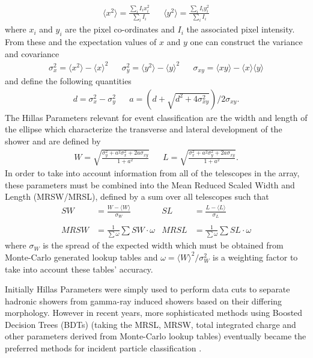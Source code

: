 \begin{align*}
\langle x^2 \rangle = \frac{\sum_i I_i x_i^2}{\sum_i I_i} && \langle y^2 \rangle = \frac{\sum_i I_i y_i^2}{\sum_i I_i}
\end{align*}
where $x_i$ and $y_i$ are the pixel co-ordinates and $I_i$ the associated pixel intensity. From these and the expectation values of $x$ and $y$ one can construct the variance and covariance
\begin{align*}
\sigma_x^2=\langle x^2 \rangle - \langle x \rangle^2&&\sigma_y^2=\langle y^2 \rangle - \langle y \rangle^2&&\sigma_{xy}=\langle xy \rangle - \langle x \rangle\langle y \rangle
\end{align*}
and define the following quantities
\begin{align*}
d=\sigma_x^2-\sigma_y^2&&a=(d+\sqrt{d^2+4\sigma_{xy}^2})/2\sigma_{xy}.
\end{align*}
The Hillas Parameters relevant for event classification are the width and length of the ellipse which characterize the transverse and lateral development of the shower and are defined by
\begin{align*}
W=\sqrt{\frac{\sigma_y^2+a^2\sigma_x^2+2a\sigma_{xy}}{1+a^2}}&&L=\sqrt{\frac{\sigma_x^2+a^2\sigma_y^2+2a\sigma_{xy}}{1+a^2}}.
\end{align*}
In order to take into account information from all of the telescopes in the array, these parameters must be combined into the Mean Reduced Scaled Width and Length (MRSW/MRSL), defined by a sum over all telescopes such that
\begin{align*}
SW&=\frac{W-\langle W \rangle}{\sigma_W}   &    SL&=\frac{L-\langle L \rangle}{\sigma_L}\\
\\ MRSW&=\frac{1}{\sum \omega}\sum SW\cdot \omega & MRSL&=\frac{1}{\sum \omega}\sum SL\cdot \omega
\end{align*}
where $\sigma_W$ is the spread of the expected width which must be obtained from Monte-Carlo generated lookup tables and $\omega=\langle W \rangle^2/\sigma_W^2$ is a weighting factor to take into account these tables' accuracy.

Initially Hillas Parameters were simply used to perform data cuts to separate hadronic showers from gamma-ray induced showers based on their differing morphology. However in recent years, more sophisticated methods using Boosted Decision Trees (BDTs) (taking the MRSL, MRSW, total integrated charge and other parameters derived from Monte-Carlo lookup tables) eventually became the preferred methods for incident particle classification \cite{hessbdt}.

